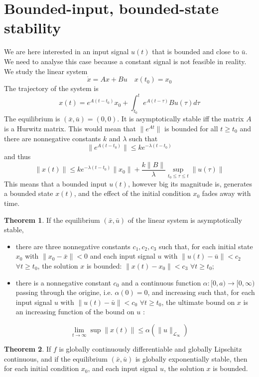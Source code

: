 \documentclass[12pt, openany]{report}
\theoremstyle{definition}
\newtheorem{thm}{Theorem}[chapter]
\begin{document}
\section{Bounded-input, bounded-state stability}
We are here interested in an input signal \(u(t)\) that is bounded and close to \(\bar u\). We need to analyse this case because a constant signal is not feasible in reality. We study the linear system
\begin{equation}
    \dot x = Ax+Bu \quad x(t_0) = x_0
\end{equation}
The trajectory of the system is
\begin{equation}
    x(t) = e^{A(t-t_0)}x_0 + \int_{t_0}^t e^{A(t-\tau)}Bu(\tau)d\tau
\end{equation}
The equilibrium is \((\bar x,\bar u)= (0,0)\). It is asymptotically stable iff the matrix \(A\) is a Hurwitz matrix. This would mean that \(\lVert e^{At}\rVert\) is bounded for all \(t\ge t_0\) and there are nonnegative constants \(k\) and \(\lambda\) such that 
\begin{equation}
    \lVert e^{A(t-t_0)}\rVert \le ke^{-\lambda(t-t_0)}
\end{equation}
and thus
\begin{equation}
    \lVert x(t)\rVert \le ke^{-\lambda (t-t_0)}\lVert x_0\rVert + \frac{k\lVert B\rVert}{\lambda}\sup_{t_0\le \tau\le t}\lVert u(\tau)\rVert
\end{equation}
This means that a bounded input \(u(t)\), however big its magnitude is, generates a bounded state \(x(t)\), and the effect of the initial condition \(x_0\) fades away with time. 
\begin{thm}
    If the equilibrium \((\bar x, \bar u)\) of the linear system is asymptotically stable,
    \begin{itemize}
        \item there are three nonnegative constants \(c_1,c_2,c_3\) such that, for each initial state \(x_0\) with \(\lVert x_0-\bar x\rVert<0\) and each input signal \(u\) with \(\lVert u(t)-\bar u\rVert <c_2\) \(\forall t\ge t_0\), the solution \(x\) is bounded: \(\lVert x(t)-x_0\rVert <c_3\) \(\forall t\ge t_0\);
        \item there is a nonnegative constant \(c_0\) and a continuous function \(\alpha :[0,a)\rightarrow [0,\infty)\) passing through the origine, i.e. \(\alpha(0)=0\), and increasing such that, for each input signal \(u\) with \(\lVert u(t)-\bar u\rVert<c_0\) \(\forall t\ge t_0\), the ultimate bound on \(x\) is an increasing function of the bound on \(u\) :
    \end{itemize}
    \begin{equation}
        \lim_{t\rightarrow \infty}\sup \lVert x(t)\rVert \le \alpha(\lVert u\rVert_{\mathcal{L}_{\infty}})
    \end{equation}
\end{thm}
\begin{thm}
    If \(f\) is globally continuously differentiable and globally Lipschitz continuous, and if the equilibrium \((\bar x,\bar u)\) is globally exponentially stable, then for each initial condition \(x_0\), and each input signal \(u\), the solution \(x\) is bounded.
\end{thm}
\end{document}

